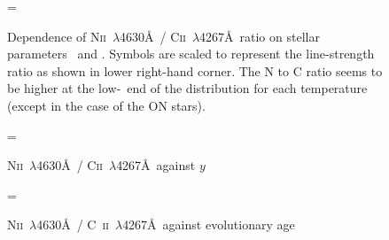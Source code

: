 \begin{figure} %
\epsfxsize=\figwidth
\setlength{\cen}{(\textwidth / 2) - (\epsfxsize / 2)}
\hspace{\cen}
\caption[Dependence N\textsc{ii}~$\lambda$4630\AA\ /
C\textsc{ii}~$\lambda$4267\AA\ of stellar parameters]
{\fcfont Dependence of N\textsc{ii}~$\lambda$4630\AA\ /
C\textsc{ii}~$\lambda$4267\AA\ ratio on stellar parameters \teff\ and
\logg. Symbols are scaled to represent the line-strength ratio as shown
in lower right-hand corner. The N to C ratio seems to be higher at the
low-\logg\ end of the distribution for each temperature (except in the
case of the ON stars).}
\label{fig:cno:behaviour}
\end{figure}   %

\begin{figure}[t] %
\setlength{\cen}{\figwidth / 2}
\epsfxsize=\cen
\setlength{\cen}{(\textwidth / 2) - (\epsfxsize / 2)}
\hspace{\cen}
\caption[N\textsc{ii}~$\lambda$4630\AA\ / C\textsc{ii}~$\lambda$4267\AA\ against $y$]
{\fcfont N\textsc{ii}~$\lambda$4630\AA\ / C\textsc{ii}~$\lambda$4267\AA\ against $y$}
\label{fig:cno:y}
\end{figure}   %

\begin{figure} %
\epsfxsize=\figwidth
\setlength{\cen}{(\textwidth / 2) - (\epsfxsize / 2)}
\hspace{\cen}
\caption[N\textsc{ii}~$\lambda$4630\AA\ / C~\textsc{ii}~$\lambda$4267\AA\ against age]
{\fcfont N\textsc{ii}~$\lambda$4630\AA\ / C~\textsc{ii}~$\lambda$4267\AA\ 
against evolutionary age}
\label{fig:cno:age}
\end{figure}   %















